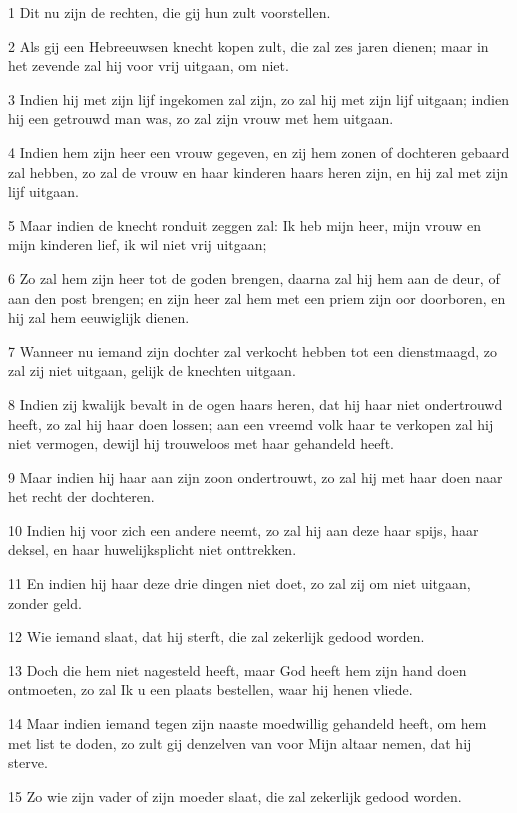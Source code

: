 \par 1 Dit nu zijn de rechten, die gij hun zult voorstellen.
\par 2 Als gij een Hebreeuwsen knecht kopen zult, die zal zes jaren dienen; maar in het zevende zal hij voor vrij uitgaan, om niet.
\par 3 Indien hij met zijn lijf ingekomen zal zijn, zo zal hij met zijn lijf uitgaan; indien hij een getrouwd man was, zo zal zijn vrouw met hem uitgaan.
\par 4 Indien hem zijn heer een vrouw gegeven, en zij hem zonen of dochteren gebaard zal hebben, zo zal de vrouw en haar kinderen haars heren zijn, en hij zal met zijn lijf uitgaan.
\par 5 Maar indien de knecht ronduit zeggen zal: Ik heb mijn heer, mijn vrouw en mijn kinderen lief, ik wil niet vrij uitgaan;
\par 6 Zo zal hem zijn heer tot de goden brengen, daarna zal hij hem aan de deur, of aan den post brengen; en zijn heer zal hem met een priem zijn oor doorboren, en hij zal hem eeuwiglijk dienen.
\par 7 Wanneer nu iemand zijn dochter zal verkocht hebben tot een dienstmaagd, zo zal zij niet uitgaan, gelijk de knechten uitgaan.
\par 8 Indien zij kwalijk bevalt in de ogen haars heren, dat hij haar niet ondertrouwd heeft, zo zal hij haar doen lossen; aan een vreemd volk haar te verkopen zal hij niet vermogen, dewijl hij trouweloos met haar gehandeld heeft.
\par 9 Maar indien hij haar aan zijn zoon ondertrouwt, zo zal hij met haar doen naar het recht der dochteren.
\par 10 Indien hij voor zich een andere neemt, zo zal hij aan deze haar spijs, haar deksel, en haar huwelijksplicht niet onttrekken.
\par 11 En indien hij haar deze drie dingen niet doet, zo zal zij om niet uitgaan, zonder geld.
\par 12 Wie iemand slaat, dat hij sterft, die zal zekerlijk gedood worden.
\par 13 Doch die hem niet nagesteld heeft, maar God heeft hem zijn hand doen ontmoeten, zo zal Ik u een plaats bestellen, waar hij henen vliede.
\par 14 Maar indien iemand tegen zijn naaste moedwillig gehandeld heeft, om hem met list te doden, zo zult gij denzelven van voor Mijn altaar nemen, dat hij sterve.
\par 15 Zo wie zijn vader of zijn moeder slaat, die zal zekerlijk gedood worden.

